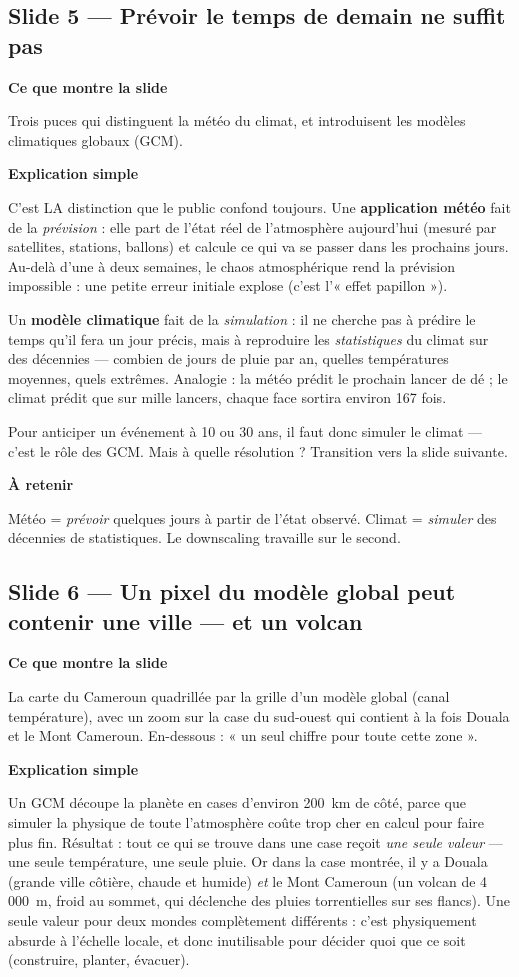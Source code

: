 \documentclass[11pt,a4paper]{article}
\newcommand{\slide}[2]{\subsection*{\textcolor{bleu}{Slide #1 --- #2}}}
\newcommand{\bloc}[1]{\par\medskip\noindent\textcolor{accent}{\textbf{#1}}\par\nopagebreak\smallskip}
\begin{document}
\slide{5}{Prévoir le temps de demain ne suffit pas}

\bloc{Ce que montre la slide}
Trois puces qui distinguent la météo du climat, et introduisent les modèles climatiques globaux (GCM).

\bloc{Explication simple}
C'est LA distinction que le public confond toujours. Une \textbf{application météo} fait de la \emph{prévision} : elle part de l'état réel de l'atmosphère aujourd'hui (mesuré par satellites, stations, ballons) et calcule ce qui va se passer dans les prochains jours. Au-delà d'une à deux semaines, le chaos atmosphérique rend la prévision impossible : une petite erreur initiale explose (c'est l'« effet papillon »).

Un \textbf{modèle climatique} fait de la \emph{simulation} : il ne cherche pas à prédire le temps qu'il fera un jour précis, mais à reproduire les \emph{statistiques} du climat sur des décennies --- combien de jours de pluie par an, quelles températures moyennes, quels extrêmes. Analogie : la météo prédit le prochain lancer de dé ; le climat prédit que sur mille lancers, chaque face sortira environ 167 fois.

Pour anticiper un événement à 10 ou 30 ans, il faut donc simuler le climat --- c'est le rôle des GCM. Mais à quelle résolution ? Transition vers la slide suivante.

\bloc{À retenir}
Météo = \emph{prévoir} quelques jours à partir de l'état observé. Climat = \emph{simuler} des décennies de statistiques. Le downscaling travaille sur le second.

\slide{6}{Un pixel du modèle global peut contenir une ville --- et un volcan}

\bloc{Ce que montre la slide}
La carte du Cameroun quadrillée par la grille d'un modèle global (canal température), avec un zoom sur la case du sud-ouest qui contient à la fois Douala et le Mont Cameroun. En-dessous : « un seul chiffre pour toute cette zone ».

\bloc{Explication simple}
Un GCM découpe la planète en cases d'environ 200~km de côté, parce que simuler la physique de toute l'atmosphère coûte trop cher en calcul pour faire plus fin. Résultat : tout ce qui se trouve dans une case reçoit \emph{une seule valeur} --- une seule température, une seule pluie. Or dans la case montrée, il y a Douala (grande ville côtière, chaude et humide) \emph{et} le Mont Cameroun (un volcan de 4\,000~m, froid au sommet, qui déclenche des pluies torrentielles sur ses flancs). Une seule valeur pour deux mondes complètement différents : c'est physiquement absurde à l'échelle locale, et donc inutilisable pour décider quoi que ce soit (construire, planter, évacuer).
\end{document}
